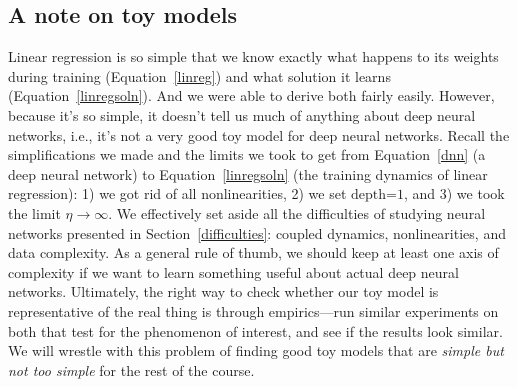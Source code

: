 \subsection{A note on toy models}

Linear regression is so simple that we know exactly what happens to its weights during training (Equation~\eqref{linreg}) and what solution it learns (Equation~\eqref{linregsoln}). And we were able to derive both fairly easily. However, because it's so simple, it doesn't tell us much of anything about deep neural networks, i.e., it's not a very good toy model for deep neural networks. Recall the simplifications we made and the limits we took to get from Equation~\eqref{dnn} (a deep neural network) to Equation~\eqref{linregsoln} (the training dynamics of linear regression): 1) we got rid of all nonlinearities, 2) we set $\text{depth=1}$, and 3) we took the limit $\eta \to \infty$. We effectively set aside all the difficulties of studying neural networks presented in Section~\ref{difficulties}: coupled dynamics, nonlinearities, and data complexity. As a general rule of thumb, we should keep at least one axis of complexity if we want to learn something useful about actual deep neural networks. Ultimately, the right way to check whether our toy model is representative of the real thing is through empirics---run similar experiments on both that test for the phenomenon of interest, and see if the results look similar. We will wrestle with this problem of finding good toy models that are \textit{simple but not too simple} for the rest of the course.